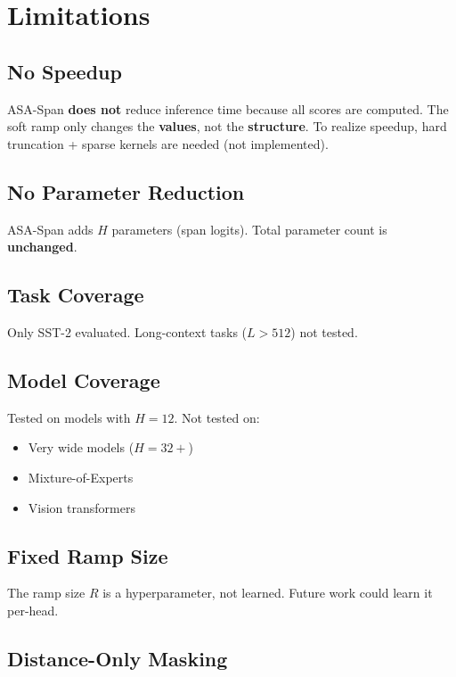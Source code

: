 
\section{Limitations}

\subsection{No Speedup}

ASA-Span \textbf{does not} reduce inference time because all scores are computed. 
The soft ramp only changes the \textbf{values}, not the \textbf{structure}. To 
realize speedup, hard truncation + sparse kernels are needed (not implemented).

\subsection{No Parameter Reduction}

ASA-Span adds $H$ parameters (span logits). Total parameter count is 
\textbf{unchanged}.

\subsection{Task Coverage}

Only SST-2 evaluated. Long-context tasks ($L > 512$) not tested.

\subsection{Model Coverage}

Tested on models with $H = 12$. Not tested on:
\begin{itemize}
\item Very wide models ($H = 32+$)
\item Mixture-of-Experts
\item Vision transformers

\end{itemize}
\subsection{Fixed Ramp Size}

The ramp size $R$ is a hyperparameter, not learned. Future work could learn 
it per-head.

\subsection{Distance-Only Masking}

